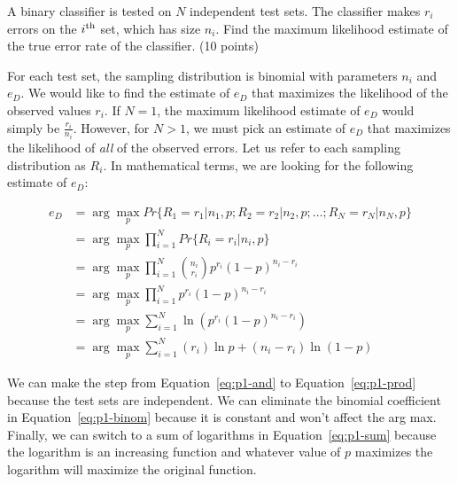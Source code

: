 \documentclass[fleqn]{homework}
\begin{document}
  \maketitle

  \begin{problem}{1}
    \begin{question}
      A binary classifier is tested on $N$ independent test sets.  The
      classifier makes $r_i$ errors on the $i\textsuperscript{th}$ set, which
      has size $n_i$.  Find the maximum likelihood estimate of the true error
      rate of the classifier. (10 points)
    \end{question}

    For each test set, the sampling distribution is binomial with parameters
    $n_i$ and $e_D$.  We would like to find the estimate of $e_D$ that maximizes
    the likelihood of the observed values $r_i$.  If $N=1$, the maximum
    likelihood estimate of $e_D$ would simply be $\frac{r_i}{n_i}$.  However,
    for $N>1$, we must pick an estimate of $e_D$ that maximizes the likelihood
    of \textit{all} of the observed errors.  Let us refer to each sampling
    distribution as $R_i$.  In mathematical terms, we are looking for the
    following estimate of $e_D$:

    \begin{align}
      e_D &= \arg \max_p Pr\{R_1 = r_1 | n_1, p; R_2 = r_2 | n_2, p; \dots; R_N =
        r_N | n_N, p\} \label{eq:p1-and} \\
      &= \arg \max_p \prod_{i=1}^N Pr\{R_i = r_i | n_i, p\} \label{eq:p1-prod} \\
      &= \arg \max_p \prod_{i=1}^N \binom{n_i}{r_i}
        p^{r_i}(1-p)^{n_i-r_i} \label{eq:p1-binom} \\
      &= \arg \max_p \prod_{i=1}^N p^{r_i}(1-p)^{n_i-r_i}  \\
      &= \arg \max_p \sum_{i=1}^N \ln (p^{r_i} (1-p)^{n_i-r_i}) \label{eq:p1-sum}\\
      &= \arg \max_p \sum_{i=1}^N (r_i) \ln p + (n_i-r_i) \ln(1-p) \label{eq:p1-mid}
    \end{align}

    We can make the step from Equation~\ref{eq:p1-and} to
    Equation~\ref{eq:p1-prod} because the test sets are independent.  We can
    eliminate the binomial coefficient in Equation~\ref{eq:p1-binom} because it
    is constant and won't affect the arg max.  Finally, we can switch to a sum
    of logarithms in Equation~\ref{eq:p1-sum} because the logarithm is an
    increasing function and whatever value of $p$ maximizes the logarithm will
    maximize the original function.


\end{problem}
\end{document}
